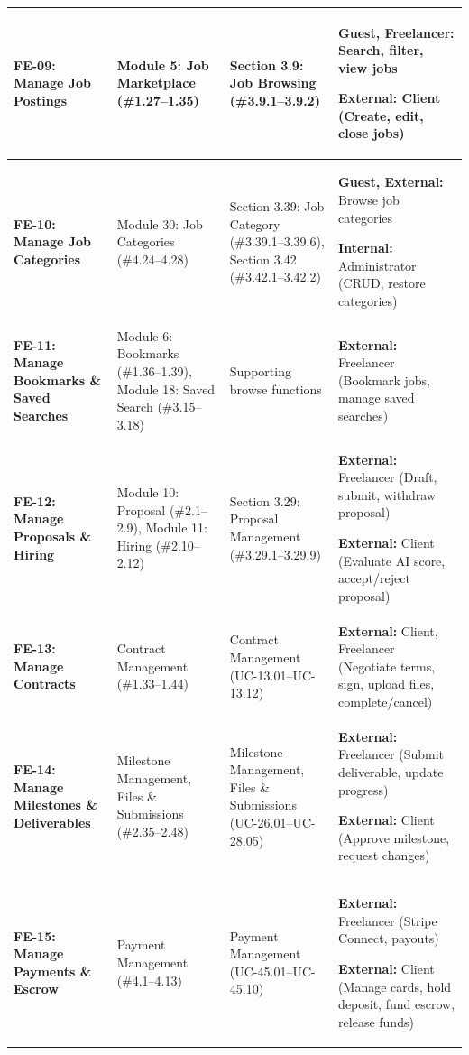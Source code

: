 \begin{longtable}{|>{\raggedright\arraybackslash}p{2.8cm}|>{\raggedright\arraybackslash}p{2.7cm}|>{\raggedright\arraybackslash}p{3.5cm}|>{\raggedright\arraybackslash}p{5.0cm}|}
\textbf{FE-09: Manage Job Postings} & 
Module 5: Job Marketplace (\#1.27--1.35) & 
Section 3.9: Job Browsing (\#3.9.1--3.9.2) & 
\textbf{Guest, Freelancer:} Search, filter, view jobs\par
\textbf{External:} Client (Create, edit, close jobs) \\ \hline

\textbf{FE-10: Manage Job Categories} & 
Module 30: Job Categories (\#4.24--4.28) & 
Section 3.39: Job Category (\#3.39.1--3.39.6), Section 3.42 (\#3.42.1--3.42.2) & 
\textbf{Guest, External:} Browse job categories\par
\textbf{Internal:} Administrator (CRUD, restore categories) \\ \hline

\textbf{FE-11: Manage Bookmarks \& Saved Searches} & 
Module 6: Bookmarks (\#1.36--1.39), Module 18: Saved Search (\#3.15--3.18) & 
Supporting browse functions & 
\textbf{External:} Freelancer (Bookmark jobs, manage saved searches) \\ \hline

\textbf{FE-12: Manage Proposals \& Hiring} & 
Module 10: Proposal (\#2.1--2.9), Module 11: Hiring (\#2.10--2.12) & 
Section 3.29: Proposal Management (\#3.29.1--3.29.9) & 
\textbf{External:} Freelancer (Draft, submit, withdraw proposal)\par
\textbf{External:} Client (Evaluate AI score, accept/reject proposal) \\ \hline

\textbf{FE-13: Manage Contracts} & 
Contract Management (\#1.33--1.44) & 
Contract Management (UC-13.01--UC-13.12) &  
\textbf{External:} Client, Freelancer (Negotiate terms, sign, upload files, complete/cancel) \\ \hline

\textbf{FE-14: Manage Milestones \& Deliverables} & 
Milestone Management, Files \& Submissions (\#2.35--2.48) & 
Milestone Management, Files \& Submissions (UC-26.01--UC-28.05) & 
\textbf{External:} Freelancer (Submit deliverable, update progress)\par
\textbf{External:} Client (Approve milestone, request changes) \\ \hline

\textbf{FE-15: Manage Payments \& Escrow} & 
Payment Management (\#4.1--4.13) & 
Payment Management (UC-45.01--UC-45.10) & 
\textbf{External:} Freelancer (Stripe Connect, payouts)\par
\textbf{External:} Client (Manage cards, hold deposit, fund escrow, release funds) \\ \hline


\end{longtable}
